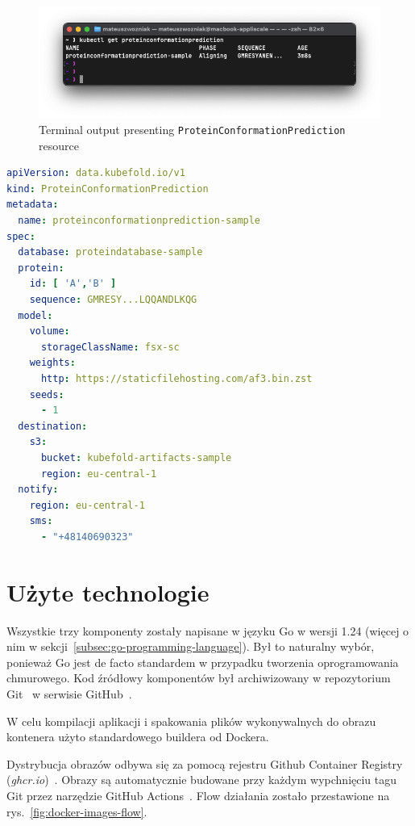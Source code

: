 \begin{figure}[htbp]
    \centering
    \includegraphics[width=\textwidth]{images/proteinconformationprediction_terminal}
    \caption{Terminal output presenting \texttt{ProteinConformationPrediction} resource}
    \label{fig:proteinconformationprediction_terminal}
\end{figure}

\begin{lstlisting}[language=yaml,caption={Przykładowy kod YAML zasobu ProteinConformationPrediction},label={lst:protein_conformation_prediction}]
apiVersion: data.kubefold.io/v1
kind: ProteinConformationPrediction
metadata:
  name: proteinconformationprediction-sample
spec:
  database: proteindatabase-sample
  protein:
    id: [ 'A','B' ]
    sequence: GMRESY...LQQANDLKQG
  model:
    volume:
      storageClassName: fsx-sc
    weights:
      http: https://staticfilehosting.com/af3.bin.zst
    seeds:
      - 1
  destination:
    s3:
      bucket: kubefold-artifacts-sample
      region: eu-central-1
  notify:
    region: eu-central-1
    sms:
      - "+48140690323"
\end{lstlisting}


\section{Użyte technologie}
Wszystkie trzy komponenty zostały napisane w języku Go w wersji 1.24 (więcej o nim w sekcji~\ref{subsec:go-programming-language}).
Był to naturalny wybór, ponieważ Go jest de facto standardem w przypadku tworzenia oprogramowania chmurowego.
Kod źródłowy komponentów był archiwizowany w repozytorium Git~\cite{git} w serwisie GitHub~\cite{github}.

W celu kompilacji aplikacji i spakowania plików wykonywalnych do obrazu kontenera użyto standardowego buildera od Dockera.

Dystrybucja obrazów odbywa się za pomocą rejestru Github Container Registry (\textit{ghcr.io})~\cite{ghcr}.
Obrazy są automatycznie budowane przy każdym wypchnięciu tagu Git przez narzędzie GitHub Actions~\cite{github_actions}.
Flow działania zostało przestawione na rys.~\ref{fig:docker-images-flow}.

